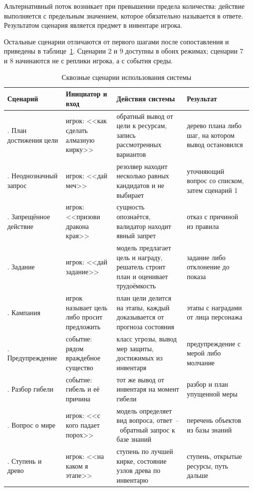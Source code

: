 Альтернативный поток возникает при превышении предела количества: действие
выполняется с предельным значением, которое обязательно называется в ответе. Результатом
сценария является предмет в инвентаре игрока.

Остальные сценарии отличаются от первого шагами после сопоставления и приведены в
таблице~\ref{tab:scenarios}. Сценарии 2 и 9 доступны в обоих режимах; сценарии 7 и 8
начинаются не с реплики игрока, а с события среды.

\begin{table}[!htbp]
  \centering
  \caption{Сквозные сценарии использования системы}
  \label{tab:scenarios}
  \begin{tabular}{|>{\raggedright\arraybackslash}p{}
                  |>{\raggedright\arraybackslash}p{}
                  |>{\raggedright\arraybackslash}p{}
                  |>{\raggedright\arraybackslash}p{}|}
    \hline
    Сценарий & Инициатор и вход & Действия системы & Результат \\
    \hline
    2. План достижения цели & игрок: <<как сделать алмазную кирку>> & обратный вывод от цели к ресурсам, запись рассмотренных вариантов & дерево плана либо шаг, на котором вывод остановился \\
    \hline
    3. Неоднозначный запрос & игрок: <<дай меч>> & резолвер находит несколько равных кандидатов и не выбирает & уточняющий вопрос со списком, затем сценарий 1 \\
    \hline
    4. Запрещённое действие & игрок: <<призови дракона края>> & сущность опознаётся, валидатор находит явный запрет & отказ с причиной из правила \\
    \hline
    5. Задание & игрок: <<дай задание>> & модель предлагает цель и награду, решатель строит план и оценивает трудоёмкость & задание либо отклонение до показа \\
    \hline
    6. Кампания & игрок называет цель либо просит предложить & план цели делится на этапы, каждый доказывается от прогноза состояния & этапы с наградами от лица персонажа \\
    \hline
    7. Предупреждение & событие: рядом враждебное существо & класс угрозы, вывод мер защиты, достижимых из инвентаря & предупреждение с мерой либо молчание \\
    \hline
    8. Разбор гибели & событие: гибель и её причина & тот же вывод от инвентаря на момент гибели & разбор и план упущенной меры \\
    \hline
    9. Вопрос о мире & игрок: <<с кого падает порох>> & модель определяет вид вопроса, ответ~--~обратный запрос к базе знаний & перечень объектов из базы знаний \\
    \hline
    10. Ступень и древо & игрок: <<на каком я этапе>> & ступень по лучшей кирке, состояние узлов древа по инвентарю & ступень, открытые ресурсы, путь дальше \\
    \hline
  \end{tabular}
\end{table}

